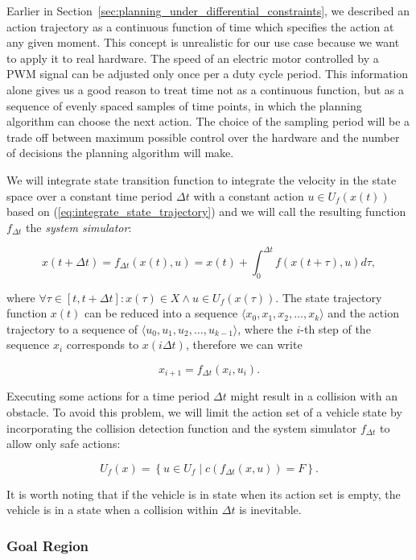 Earlier in Section~\ref{sec:planning_under_differential_constraints}, we described an action trajectory as a continuous function of time which specifies the action at any given moment. This concept is unrealistic for our use case because we want to apply it to real hardware. The speed of an electric motor controlled by a \gls{PWM} signal can be adjusted only once per a duty cycle period. This information alone gives us a good reason to treat time not as a continuous function, but as a sequence of evenly spaced samples of time points, in which the planning algorithm can choose the next action. The choice of the sampling period will be a trade off between maximum possible control over the hardware and the number of decisions the planning algorithm will make.

We will integrate state transition function to integrate the velocity in the state space over a constant time period $\Delta t$ with a constant action $u\in U_f(x(t))$ based on (\ref{eq:integrate_state_trajectory}) and we will call the resulting function $f_{\Delta t}$ the \textit{system simulator}:

\begin{equation}
	x(t+\Delta t)=f_{\Delta t}(x(t), u)=x(t) + \int_{0}^{\Delta t} f\left(x(t+\tau), u \right) d\tau,
\end{equation}

where $\forall \tau \in [t, t+\Delta t]: x(\tau)\in X \wedge u\in U_f(x(\tau))$. The state trajectory function $x(t)$ can be reduced into a sequence $\langle x_0, x_1, x_2, \ldots, x_k\rangle$ and the action trajectory to a sequence of $\langle u_0, u_1, u_2, \ldots, u_{k-1}\rangle$, where the $i$-th step of the sequence $x_i$ corresponds to $x(i\Delta t)$, therefore we can write

\[
	x_{i+1}=f_{\Delta t}(x_i, u_i).
\]

Executing some actions for a time period $\Delta t$ might result in a collision with an obstacle. To avoid this problem, we will limit the action set of a vehicle state by incorporating the collision detection function and the system simulator $f_{\Delta t}$ to allow only safe actions:

\[
U_f(x)=\left\{u\in U_f \mid c(f_{\Delta t}(x, u)) = F\right\}.
\]

It is worth noting that if the vehicle is in state when its action set is empty, the vehicle is in a state when a collision within $\Delta t$ is inevitable.

\subsubsection{Goal Region}

